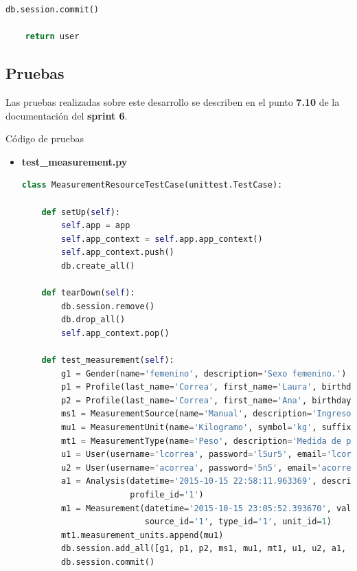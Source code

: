 \documentclass[a4paper,12pt]{article}
\begin{document}
\begin{enumerate}
\begin{lstlisting}[language=Python]
    db.session.commit()

    return user
\end{lstlisting}

\end{enumerate}

\subsection{Pruebas}

Las pruebas realizadas sobre este desarrollo se describen en el punto \textbf{7.10} de la documentación del \textbf{sprint 6}.

Código de pruebas

\begin{itemize}

\item \textbf{test\_measurement.py}

\begin{lstlisting}[language=Python]
class MeasurementResourceTestCase(unittest.TestCase):

    def setUp(self):
        self.app = app
        self.app_context = self.app.app_context()
        self.app_context.push()
        db.create_all()

    def tearDown(self):
        db.session.remove()
        db.drop_all()
        self.app_context.pop()

    def test_measurement(self):
        g1 = Gender(name='femenino', description='Sexo femenino.')
        p1 = Profile(last_name='Correa', first_name='Laura', birthday='1998-08-20', gender_id='1')
        p2 = Profile(last_name='Correa', first_name='Ana', birthday='1998-04-10', gender_id='1')
        ms1 = MeasurementSource(name='Manual', description='Ingreso manual de la medida.')
        mu1 = MeasurementUnit(name='Kilogramo', symbol='kg', suffix='True')
        mt1 = MeasurementType(name='Peso', description='Medida de peso de una persona')
        u1 = User(username='lcorrea', password='l5ur5', email='lcorrea@yesdoc.com', profile_id='1')
        u2 = User(username='acorrea', password='5n5', email='acorrea@yesdoc.com', profile_id='2')
        a1 = Analysis(datetime='2015-10-15 22:58:11.963369', description='Primer toma de medidas de peso',
                      profile_id='1')
        m1 = Measurement(datetime='2015-10-15 23:05:52.393670', value='74', analysis_id='1', profile_id='1',
                         source_id='1', type_id='1', unit_id=1)
        mt1.measurement_units.append(mu1)
        db.session.add_all([g1, p1, p2, ms1, mu1, mt1, u1, u2, a1, m1])
        db.session.commit()


\end{lstlisting}
\end{itemize}
\end{document}
